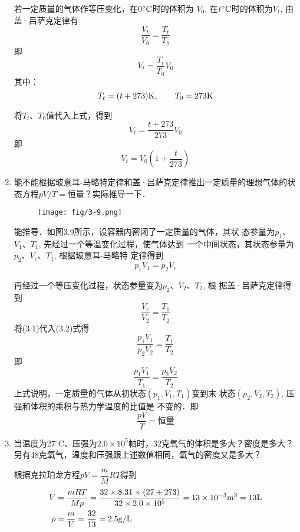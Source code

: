 \begin{enumerate}
\begin{solution}
    若一定质量的气体作等压变化，在$0^{\circ}{\rm C}$时的体积为
    $V_0$, 在$t^{\circ}{\rm C}$时的体积为$V_t$, 由盖·吕萨克定律有
\[\frac{V_t}{V_0}=\frac{T_t}{T_0}\]
即\[V_t=\frac{T_t}{T_0}V_0\]
其中：
\[T_t=(t+273){\rm K},\qquad T_0=273{\rm K}\]

将$T_t$、$T_0$值代入上式，得到
\[V_t=\frac{t+273}{273}V_0\]
即
\[V_t=V_0\left(1+\frac{t}{273}\right) \]


\end{solution}
\item 能不能根据玻意耳-马略特定律和盖·吕萨克定律推出一定质量的理想气体的状态方程$pV/T=$恒量？实际推导一下．

\begin{figure}[htp]
    \centering
\texttt{[image: fig/3-9.png]}
    \caption{}
\end{figure}

\begin{solution}
    能推导．如图3.9所示，设容器内密闭了一定质量的气体，其状
    态参量为$p_1$、$V_1$、$T_1$, 先经过一个等温变化过程，使气体达到
    一个中间状态，其状态参量为$p_2$、$V_c$、$T_1$, 根据玻意耳-马略特
    定律得到
\begin{equation}
    p_1V_1=p_2V_c
\end{equation}

再经过一个等压变化过程，状态参量变为$p_2$、$V_2$、$T_2$, 根
据盖·吕萨克定律得到
\begin{equation}
    \frac{V_c}{V_2}=\frac{T_1}{T_2}
\end{equation}
将(3.1)代入(3.2)式得
\[\frac{p_1V_1}{p_2V_2}=\frac{T_1}{T_2}\]
即
\[\frac{p_1V_1}{T_1}=\frac{p_2V_2}{T_2}\]
上式说明，一定质量的气体从初状态$(p_1,V_1,T_1)$变到末
状态$(p_2,V_2,T_2)$, 压强和体积的乘积与热力学温度的比值是
不变的．即
\[\frac{pV}{T}=\text{恒量}\]
\end{solution}
\item 当温度为27$^\circ$C、压强为$2.0\times 10^5$帕时，32克氧气的体积是多大？密度是多大？另有48克氧气，温度和压强跟上述数值相同，氧气的密度又是多大？	

\begin{solution}
    根据克拉珀龙方程$pV=\dfrac{m}{M}RT$得到
\[\begin{split}
    V&=\frac{mRT}{Mp}=\frac{32\times 8.31\times (27+273)}{32\times 2.0\times 10^5}=13\times 10^{-3}{\rm m^3}=13{\rm L}\\
    \rho&=\frac{m}{V}=\frac{32}{13}=2.5{\rm g/L}
\end{split}\]


\end{solution}
\end{enumerate}
